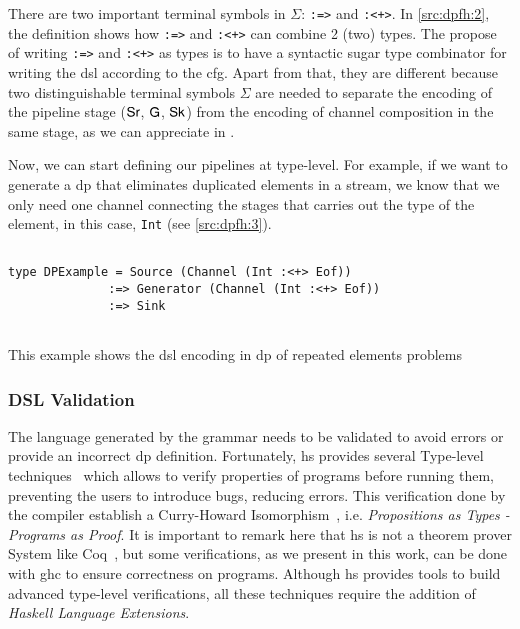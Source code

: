 There are two important terminal symbols in $\Sigma$: \texttt{:=>} and \texttt{:<+>}.
In \autoref{src:dpfh:2}, the definition shows how \texttt{:=>} and \texttt{:<+>} can combine 2 (two) types. 
The propose of writing \texttt{:=>} and \texttt{:<+>} as types is to have a syntactic sugar type combinator for writing the \acrshort{dsl} according to the \acrshort{cfg}. 
Apart from that, they are different because two distinguishable terminal symbols $\Sigma$ are needed to separate the encoding of the pipeline stage ($\mathsf{Sr}$, $\mathsf{G}$, $\mathsf{Sk}$)
from the encoding of channel composition in the same stage, as we can appreciate in .

Now, we can start defining our pipelines at type-level. For example, if we want to generate a \acrshort{dp} that eliminates duplicated elements in a stream, we know that we only need one channel connecting the stages that carries out the type of the element, in this case, \texttt{Int} (see \autoref{src:dpfh:3}).

\begin{listing}[H]
  \begin{verbatim}

type DPExample = Source (Channel (Int :<+> Eof)) 
              :=> Generator (Channel (Int :<+> Eof)) 
              :=> Sink
   
  \end{verbatim}
  \caption[{[\texttt{Repeated.hs} Example of \acrshort{dp} encoded in $G_{dsl}$}]{This example shows the \acrshort{dsl} encoding in \acrshort{dp} of repeated elements problems}
  \label{src:dpfh:3}
\end{listing}

\subsubsection{DSL Validation}\label{sub:sec:dsl-val}
The language generated by the grammar needs to be validated to avoid errors or provide an incorrect \acrshort{dp} definition.
Fortunately, \acrshort{hs} provides several Type-level techniques~\cite{type-haskell} which allows to verify properties of programs before running them, 
preventing the users to introduce bugs, reducing errors. This verification done by the compiler establish a Curry-Howard Isomorphism~\cite{curryhoward}, i.e. 
\emph{Propositions as Types - Programs as Proof}. It is important to remark here that \acrshort{hs} is not a theorem prover System like Coq~\cite{coq}, but some verifications, as we present in this work, can be done with \acrshort{ghc} to ensure correctness on programs.
Although \acrshort{hs} provides tools to build advanced type-level verifications, all these techniques require the addition of \emph{Haskell Language Extensions}.

